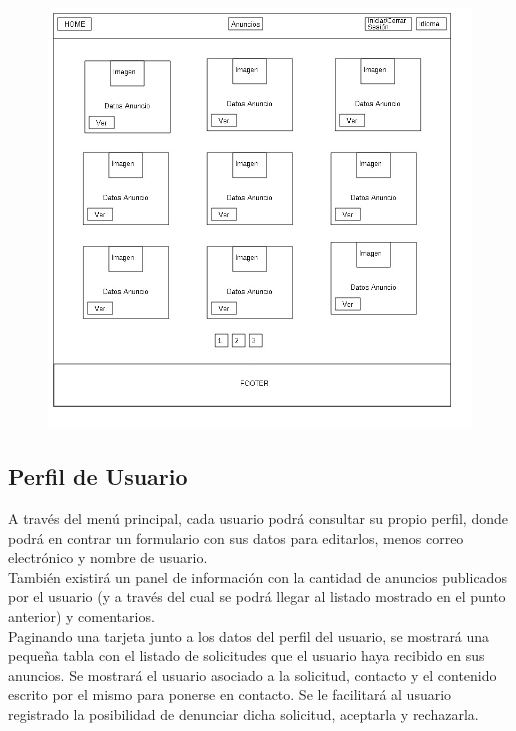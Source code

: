 \begin{figure}[h!]
\centering
\includegraphics[width=1\textwidth]{Img/VisionAplicacion/vision_10.jpg}
\end{figure}


\subsection{Perfil de Usuario}
A trav\'{e}s del men\'{u} principal, cada usuario podr\'{a} consultar su propio perfil, donde podr\'{a} en contrar un formulario con sus datos para editarlos, menos correo electr\'{o}nico y nombre de usuario.\\

Tambi\'{e}n existir\'{a} un panel de informaci\'{o}n con la cantidad de anuncios publicados por el usuario (y a trav\'{e}s del cual se podr\'{a} llegar al listado mostrado en el punto anterior) y comentarios.\\

Paginando una tarjeta junto a los datos del perfil del usuario, se mostrar\'{a} una peque\~{n}a tabla con el listado de solicitudes que el usuario haya recibido en sus anuncios. Se mostrar\'{a} el usuario asociado a la solicitud, contacto y el contenido escrito por el mismo para ponerse en contacto. Se le facilitar\'{a} al usuario registrado la posibilidad de denunciar dicha solicitud, aceptarla y rechazarla.

